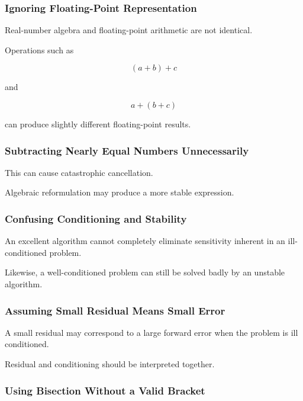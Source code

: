 \subsubsection{Ignoring Floating-Point Representation}

Real-number algebra and floating-point arithmetic are not identical.

Operations such as

\[
(a+b)+c
\]

and

\[
a+(b+c)
\]

can produce slightly different floating-point results.

\subsubsection{Subtracting Nearly Equal Numbers Unnecessarily}

This can cause catastrophic cancellation.

Algebraic reformulation may produce a more stable expression.

\subsubsection{Confusing Conditioning and Stability}

An excellent algorithm cannot completely eliminate sensitivity inherent in
an ill-conditioned problem.

Likewise, a well-conditioned problem can still be solved badly by an
unstable algorithm.

\subsubsection{Assuming Small Residual Means Small Error}

A small residual may correspond to a large forward error when the problem
is ill conditioned.

Residual and conditioning should be interpreted together.

\subsubsection{Using Bisection Without a Valid Bracket}

